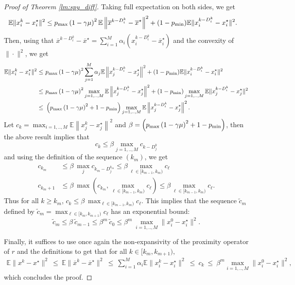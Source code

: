\begin{proof}[Proof of Theorem \ref{lm:spy_diff}]
Taking full expectation on both sides, we get 
\begin{align*}
    \mathbb{E}\|x_i^k - x_i^\star\|^2 &\leq p_{\max} \left(1-\gamma\mu\right)^2 \mathbb{E}\left\| \overline{x}^{k-D_i^k} - \overline{x}^\star \right\|^2 + (1-p_{\min}) \mathbb{E}\| x_{i}^{k-D_i^k} - {x}_{i}^{\star}\|^2.
\end{align*}
Then,  using that $\overline{x}^{k-D_i^k} - \overline{x}^\star  =  \sum_{i=1}^M \alpha_i ( {x}_i^{k-D_i^k} - \overline{x}_i^\star)$ and the convexity of $\|\cdot\|^2$, we get
\begin{align*}
    \mathbb{E}\|x_i^k - x_i^\star\|^2 
   \leq ~ &p_{\max} \left(1-\gamma\mu\right)^2 \sum_{j=1}^M \alpha_j \mathbb{E}\left\| x_j^{k-D_i^k} - x_j^\star \right\|^2 
 + (1-p_{\min})\mathbb{E} \| x_{i}^{k-D_i^k} - {x}_{i}^{\star}\|^2 \\
   \leq ~ &p_{\max} \left(1-\gamma\mu\right)^2 \max_{j=1,..,M} \mathbb{E}\left\| x_j^{k-D_i^k} - x_j^\star \right\|^2 
 + (1-p_{\min}) \max_{j=1,..,M}  \mathbb{E}\| x_{j}^{k-D_i^k} - {x}_{j}^{\star}\|^2 \\
   \leq ~ & \left( p_{\max}\left(1-\gamma\mu\right)^2  + 1 - p_{\min} \right) \max_{j=1,..,M} \mathbb{E}\left\| x_j^{k-D_i^k} - x_j^\star \right\|^2.
\end{align*}
Let $c_k = \max_{i=1,..,M} \mathbb{E}\left\| x_j^{k} - x_j^\star \right\|^2$ and $\beta = \left( p_{\max}\left(1-\gamma\mu\right)^2  + 1 - p_{\min} \right)$, then the above result implies that
$$
    c_{k} \leq \beta \max_{j=1,..,M} c_{k-D_j^k}
$$
and using the definition of the sequence $(k_m)$, we get 
\begin{align*}
    c_{k_m} &\leq \beta ~ \max_{j} c_{k_m-D_j^{k_m}} \leq  \beta \max_{\ell\in[k_{m-1},k_m)} c_{\ell} \\
  c_{k_m+1} &\leq  \beta ~ \max( c_{k_m} , \max_{\ell\in[k_{m-1},k_m)} c_{\ell}) \leq  \beta \max_{\ell\in[k_{m-1},k_m)} c_{\ell}.
\end{align*}
Thus for all $k \geq k_m$, $ c_k \leq  \beta ~ \max_{\ell\in[k_{m-1},k_m)} c_{\ell}$. This implies that the sequence $\widetilde{c}_{m}$ defined by $\widetilde{c}_{m}= \max_{\ell\in[k_{m},k_{m+1})} c_{\ell}$ has an exponential bound:
\begin{equation*}
    \widetilde{c}_{m} \leq   \beta ~ \widetilde{c}_{m-1} \leq \beta^m ~ \widetilde{c}_{0}\leq \beta^m ~ \max_{i=1,..,M} \|x_i^0 - x_i^\star\|^2.
\end{equation*}

Finally, it suffices to use once again the non-expansivity of the proximity operator of $r$ and the definitions to get that for all $k\in [k_m,k_{m+1}),$
\begin{align}\label{eq:spy_rate}
 \mathbb{E}\|x^k - x^\star\|^2 ~\leq~ \mathbb{E}\|\overline{x}^k - \overline{x}^\star\|^2 
    ~\leq~ \sum_{i=1}^M \alpha_i \mathbb{E}\|{x}_i^k - {x}_i^\star\|^2
    ~\leq~ c_k ~\leq~ \beta^m  \max_{i=1,..,M} \|x_i^0 - x_i^\star\|^2,
\end{align}
which concludes the proof.
\end{proof}

